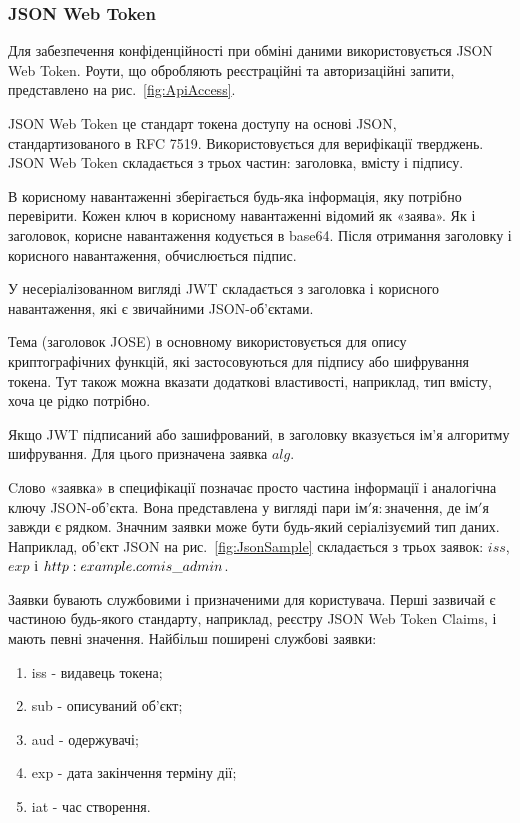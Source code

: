 \subsubsection{JSON Web Token} \label{subsubsection:jwt}


Для забезпечення конфіденційності при обміні даними використовується JSON Web Token. Роути, що обробляють реєстраційні та авторизаційні запити, представлено на рис.~\ref{fig:ApiAccess}.

JSON Web Token це стандарт токена доступу на основі JSON, стандартизованого в RFC 7519. Використовується для верифікації тверджень. JSON Web Token складається з трьох частин: заголовка, вмісту і підпису.

В корисному навантаженні зберігається будь-яка інформація, яку потрібно перевірити. Кожен ключ в корисному навантаженні відомий як «заява». Як і заголовок, корисне навантаження кодується в base64. Після отримання заголовку і корисного навантаження, обчислюється підпис.

У несеріалізованном вигляді JWT складається з заголовка і корисного навантаження, які є звичайними JSON-об'єктами.

Тема (заголовок JOSE) в основному використовується для опису криптографічних функцій, які застосовуються для підпису або шифрування токена. Тут також можна вказати додаткові властивості, наприклад, тип вмісту, хоча це рідко потрібно.

Якщо JWT підписаний або зашифрований, в заголовку вказується ім'я алгоритму шифрування. Для цього призначена заявка $alg$.

Cлово «заявка» в специфікації позначає просто частина інформації і аналогічна ключу JSON-об'єкта. Вона представлена у вигляді пари $ім'я: значення$, де $ім'я$ завжди є рядком. Значним заявки може бути будь-який серіалізуємий тип даних. Наприклад, об'єкт JSON на рис.~\ref{fig:JsonSample} складається з трьох заявок: $iss$, $exp$ і $http:\/\/example.com\/is\_admin$.


Заявки бувають службовими і призначеними для користувача. Перші зазвичай є частиною будь-якого стандарту, наприклад, реєстру JSON Web Token Claims, і мають певні значення. Найбільш поширені службові заявки:

\begin{enumerate}
	\item iss - видавець токена;
	\item sub - описуваний об'єкт;
	\item aud - одержувачі;
	\item exp - дата закінчення терміну дії;
	\item iat - час створення.
\end{enumerate}

